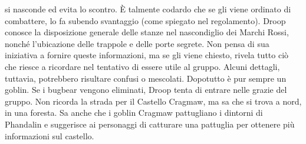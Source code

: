 \documentclass{article}
\begin{document}
        si nasconde ed evita lo scontro. È talmente codardo che se gli
        viene ordinato di combattere, lo fa subendo svantaggio (come
        spiegato nel regolamento).
        Droop conosce la disposizione generale delle stanze nel
        nascondiglio dei Marchi Rossi, nonché l’ubicazione delle
        trappole e delle porte segrete. Non pensa di sua iniziativa a
        fornire queste informazioni, ma se gli viene chiesto, rivela
        tutto ciò che riesce a ricordare nel tentativo di essere utile al gruppo. Alcuni dettagli, tuttavia, potrebbero risultare confusi
        o mescolati. Dopotutto è pur sempre un goblin.
        Se i bugbear vengono eliminati, Droop tenta di entrare
        nelle grazie del gruppo. Non ricorda la strada per il Castello
        Cragmaw, ma sa che si trova a nord, in una foresta. Sa anche
        che i goblin Cragmaw pattugliano i dintorni di Phandalin
        e suggerisce ai personaggi di catturare una pattuglia per
        ottenere più informazioni sul castello.
\end{document}
